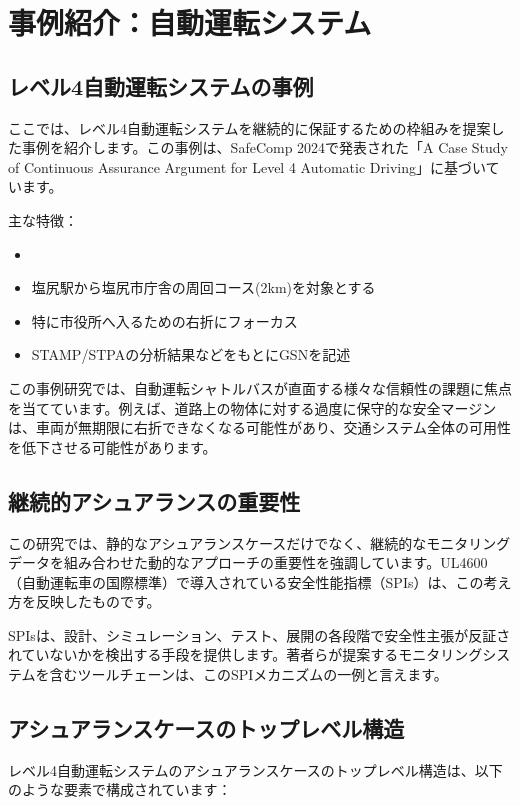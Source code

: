 \section{事例紹介：自動運転システム}

\subsection{レベル4自動運転システムの事例}

ここでは、レベル4自動運転システムを継続的に保証するための枠組みを提案した事例を紹介します。この事例は、SafeComp 2024で発表された「A Case Study of Continuous Assurance Argument for Level 4 Automatic Driving」に基づいています。

主な特徴：

\begin{itemize}
    \item\item 塩尻駅から塩尻市庁舎の周回コース(2km)を対象とする
    \item 特に市役所へ入るための右折にフォーカス
    \item STAMP/STPAの分析結果などをもとにGSNを記述
\end{itemize}

この事例研究では、自動運転シャトルバスが直面する様々な信頼性の課題に焦点を当てています。例えば、道路上の物体に対する過度に保守的な安全マージンは、車両が無期限に右折できなくなる可能性があり、交通システム全体の可用性を低下させる可能性があります。

\subsection{継続的アシュアランスの重要性}

この研究では、静的なアシュアランスケースだけでなく、継続的なモニタリングデータを組み合わせた動的なアプローチの重要性を強調しています。UL4600（自動運転車の国際標準）で導入されている安全性能指標（SPIs）は、この考え方を反映したものです。

SPIsは、設計、シミュレーション、テスト、展開の各段階で安全性主張が反証されていないかを検出する手段を提供します。著者らが提案するモニタリングシステムを含むツールチェーンは、このSPIメカニズムの一例と言えます。

\subsection{アシュアランスケースのトップレベル構造}

レベル4自動運転システムのアシュアランスケースのトップレベル構造は、以下のような要素で構成されています：

